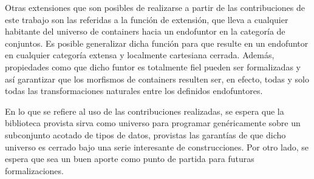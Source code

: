 Otras extensiones que son posibles de realizarse a partir de las contribuciones de este trabajo son las referidas a la función de extensión, que lleva a cualquier habitante del universo de containers hacia un endofuntor en la categoría de conjuntos. Es posible generalizar dicha función para que resulte en un endofuntor en cualquier categoría extensa y localmente cartesiana cerrada. Además, propiedades como que dicho funtor es totalmente fiel pueden ser formalizadas y así garantizar que los morfismos de containers resulten ser, en efecto, todas y solo todas las transformaciones naturales entre los definidos endofuntores. 

En lo que se refiere al uso de las contribuciones realizadas, se espera que la biblioteca provista sirva como universo para programar genéricamente sobre un subconjunto acotado de tipos de datos, provistas las garantías de que dicho universo es cerrado bajo una serie interesante de construcciones. Por otro lado, se espera que sea un buen aporte como punto de partida para futuras formalizaciones. 







